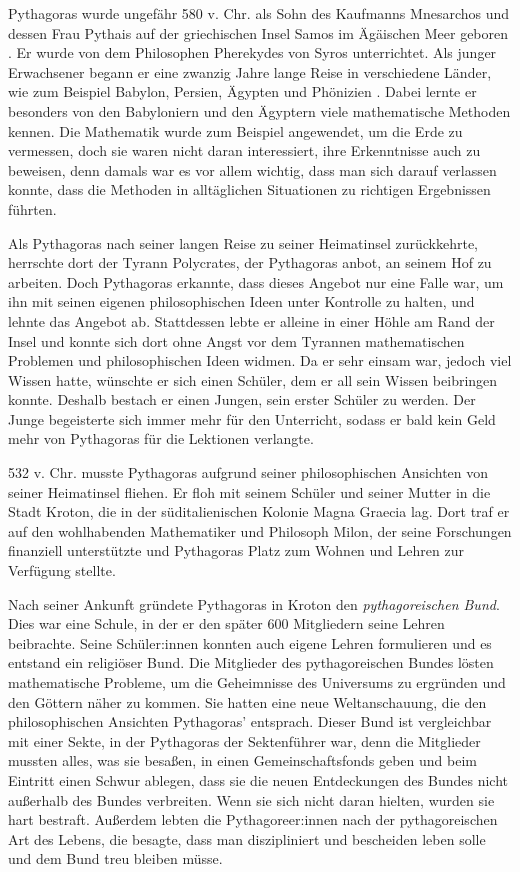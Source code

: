 \documentclass[a4paper,12pt]{article}
\begin{document}
 Pythagoras wurde ungefähr 580 v. Chr. \cite{PythagorasGeburt} als Sohn des Kaufmanns Mnesarchos und dessen Frau Pythais auf der griechischen Insel Samos im  Ägäischen Meer geboren \cite{PythagorasLeben}. Er wurde von dem Philosophen Pherekydes von Syros unterrichtet. Als junger Erwachsener begann er eine zwanzig Jahre lange Reise in verschiedene Länder, wie zum Beispiel Babylon, Persien, Ägypten und Phönizien \cite[S. 31-34]{Buch}. Dabei lernte er besonders von den Babyloniern und den Ägyptern viele mathematische Methoden kennen. Die Mathematik wurde zum Beispiel angewendet, um die Erde zu vermessen, doch sie waren nicht daran interessiert, ihre Erkenntnisse auch zu beweisen, denn damals war es vor allem wichtig, dass man sich darauf verlassen konnte, dass die Methoden in alltäglichen Situationen zu richtigen Ergebnissen führten.

Als Pythagoras nach seiner langen Reise zu seiner Heimatinsel zurückkehrte, herrschte dort der Tyrann Polycrates, der Pythagoras anbot, an seinem Hof zu arbeiten. Doch Pythagoras erkannte, dass dieses Angebot nur eine Falle war, um ihn mit seinen eigenen philosophischen Ideen unter Kontrolle zu halten, und lehnte das Angebot ab. Stattdessen lebte er alleine in einer Höhle am Rand der Insel und konnte sich dort ohne Angst vor dem Tyrannen mathematischen Problemen und philosophischen Ideen widmen. Da er sehr einsam war, jedoch viel Wissen hatte, wünschte er sich einen Schüler, dem er all sein Wissen beibringen konnte. Deshalb bestach er einen Jungen, sein erster Schüler zu werden. Der Junge begeisterte sich immer mehr für den Unterricht, sodass er bald kein Geld mehr von Pythagoras für die Lektionen verlangte.

532 v. Chr. musste Pythagoras aufgrund seiner philosophischen Ansichten von seiner Heimatinsel fliehen. Er floh mit seinem Schüler und seiner Mutter in die Stadt Kroton, die in der süditalienischen Kolonie Magna Graecia lag. Dort traf er auf den wohlhabenden Mathematiker und Philosoph Milon, der seine Forschungen finanziell unterstützte und Pythagoras Platz zum Wohnen und Lehren zur Verfügung stellte.

Nach seiner Ankunft gründete Pythagoras in Kroton den \emph{pythagoreischen Bund}. Dies war eine Schule, in der er den später 600 Mitgliedern seine Lehren beibrachte. Seine Schüler:innen konnten auch eigene Lehren formulieren und es entstand ein religiöser Bund. Die Mitglieder des pythagoreischen Bundes lösten mathematische Probleme, um die Geheimnisse des Universums zu ergründen und den Göttern näher zu kommen. Sie hatten eine neue Weltanschauung, die den philosophischen Ansichten Pythagoras' entsprach. Dieser Bund ist vergleichbar mit einer Sekte, in der Pythagoras der Sektenführer war, denn die Mitglieder mussten alles, was sie besaßen, in einen Gemeinschaftsfonds geben und beim Eintritt einen Schwur ablegen, dass sie die neuen Entdeckungen des Bundes nicht außerhalb des Bundes verbreiten. Wenn sie sich nicht daran hielten, wurden sie hart bestraft. Außerdem lebten die Pythagoreer:innen nach der pythagoreischen Art des Lebens, die besagte, dass man diszipliniert und bescheiden leben solle und dem Bund treu bleiben müsse.
\end{document}
